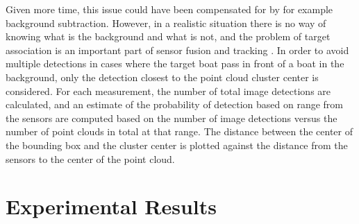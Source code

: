 Given more time, this issue could have been compensated for by for example background subtraction. However, in a realistic situation there is no way of knowing what is the background and what is not, and the problem of target association is an important part of sensor fusion and tracking . In order to avoid multiple detections in cases where the target boat pass in front of a boat in the background, only the detection closest to the point cloud cluster center is considered. For each measurement, the number of total image detections are calculated, and an estimate of the probability of detection based on range from the sensors are computed based on the number of image detections versus the number of point clouds in total at that range. The distance between the center of the bounding box and the cluster center is plotted against the distance from the sensors to the center of the point cloud.
\section{Experimental Results}
